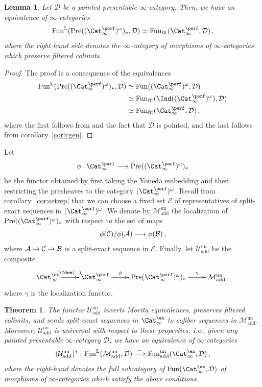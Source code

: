 \documentclass{amsart}
\newcommand{\htp}{\simeq}
\renewcommand{\to}{\mathchoice{\longrightarrow}{\rightarrow}{\rightarrow}{\rightarrow}}
\newcommand{\cA}{{\mathcal A}}
\newcommand{\cB}{{\mathcal B}}
\newcommand{\cC}{{\mathcal C}}
\newcommand{\cD}{{\mathcal D}}
\newcommand{\cM}{{\mathcal M}}
\newcommand{\cU}{{\mathcal U}}
\let\catsymbfont\mathcal
\newcommand{\aA}{{\catsymbfont{A}}}
\newcommand{\aB}{{\catsymbfont{B}}}
\newcommand{\aC}{{\catsymbfont{C}}}
\newcommand{\aD}{{\catsymbfont{D}}}
\newcommand{\aE}{{\catsymbfont{E}}}
\renewcommand{\L}{\mathrm{L}}
\newcommand{\flt}{\mathrm{flt}}%
\newcommand{\Pre}{\mathrm{Pre}}
\newcommand{\stabcat}{\Cat_\i^{\ex}}
\newcommand{\idemstabcat}{\Cat_\i^{\perf}}
\newcommand{\Fun}{\mathrm{Fun}} %
\newcommand{\too}{\longrightarrow}%
\renewcommand{\i}{\infty}
\newcommand{\Motaddun}{\cM_{\mathrm{add}}^{\mathrm{un}}}
\newcommand{\Umotun}{\cU_{\mathrm{add}}^{\mathrm{un}}}
\numberwithin{equation}{section}
\newtheorem{theorem}[equation]{Theorem}
\newtheorem{lemma}[equation]{Lemma}
\theoremstyle{definition}
\begin{document}
\begin{lemma}\label{lem:filtrant}
Let $\cD$ be a pointed presentable $\i$-category. Then, we have an
equivalence of $\i$-categories
$$ \Fun^{\L}(\Pre((\idemstabcat)^{\omega})_*, \aD)
\simeq \Fun_{\flt}(\idemstabcat, \aD)\,,$$
where the right-hand side denotes the $\i$-category of morphisms of
$\i$-categories which preserve filtered colimits.
\end{lemma}
\begin{proof}
The proof is a consequence of the equivalences
\begin{align*}
\Fun^{\L}(\Pre((\idemstabcat)^{\omega})_*, \aD)
&\htp \Fun((\idemstabcat)^{\omega}, \aD) \\
&\htp \Fun_{\flt}(\Ind((\idemstabcat)^{\omega}), \aD) \\
&\htp \Fun_{\flt}(\idemstabcat, \aD)\,,
\end{align*}
where the first follows from \cite[5.1.5.6]{HTT} and the fact that $\aD$ is pointed, and the last follows from corollary~\ref{cor:cgen}. 
\end{proof}

Let
\[
\phi \colon \idemstabcat \to \Pre((\idemstabcat)^{\omega})_*
\]
be the functor obtained by first taking the Yoneda embedding and then
restricting the presheaves to the category
$(\idemstabcat)^{\omega}$. Recall from corollary~\ref{cor:setrep} that
we can choose a fixed set $\aE$ of representatives of split-exact
sequences in
$(\idemstabcat)^{\omega}$. We denote by $\Motaddun$ the
localization of $\Pre((\idemstabcat)^{\omega})_*$
\cite[5.5.4.15]{HTT} with respect to the set of maps
\begin{equation}\label{eqn:splitlocs}
\phi (\aC)/\phi(\aA) \to \phi (\aB)\,,
\end{equation}
where $\aA \to \aC \to \aB$ is a split-exact sequence in $\aE$.
Finally, let $\Umotun$ be the composite
\begin{equation}\label{un}
\xymatrix{
\stabcat \ar[r]^-{\Idem(-)}
& \idemstabcat \ar[r]^-{\phi} & \Pre(\idemstabcat)^{\omega})_* \ar[r]^-{\gamma}
& \Motaddun \,,
}
\end{equation}
where $\gamma$ is the localization functor.
\begin{theorem}\label{thm:weakadd}
The functor $\Umotun$ inverts Morita equivalences, preserves filtered colimits, and sends split-exact sequences in $\stabcat$ to cofiber sequences in $\Motaddun$.
Moreover, $\Umotun$ is universal with respect to these properties,
i.e., given any pointed presentable $\i$-category $\aD$, we have an equivalence of $\i$-categories
\[
(\Umotun)^{\ast}: \Fun^{\L}(\Motaddun, \aD) \stackrel{\sim}{\too} \Fun_{\mathrm{add}}^{\mathrm{un}}(\stabcat, \aD)\,,
\]
where the right-hand denotes the full subcategory of
$\Fun(\stabcat, \aD)$ of morphisms of $\i$-categories which satisfy
the above conditions.
\end{theorem}
\end{document}

